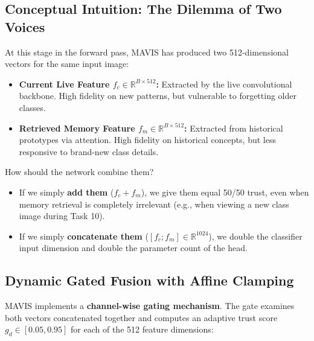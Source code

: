 \documentclass[11pt,a4paper]{article}
\begin{document}
\subsection{Conceptual Intuition: The Dilemma of Two Voices}
At this stage in the forward pass, MAVIS has produced two 512-dimensional vectors for the same input image:
\begin{itemize}[noitemsep]
    \item \textbf{Current Live Feature $f_c \in \mathbb{R}^{B \times 512}$:} Extracted by the live convolutional backbone. High fidelity on new patterns, but vulnerable to forgetting older classes.
    \item \textbf{Retrieved Memory Feature $f_m \in \mathbb{R}^{B \times 512}$:} Extracted from historical prototypes via attention. High fidelity on historical concepts, but less responsive to brand-new class details.
\end{itemize}
How should the network combine them? 
\begin{itemize}[noitemsep]
    \item If we simply \textbf{add them} ($f_c + f_m$), we give them equal 50/50 trust, even when memory retrieval is completely irrelevant (e.g., when viewing a new class image during Task 10).
    \item If we simply \textbf{concatenate them} ($[f_c ; f_m] \in \mathbb{R}^{1024}$), we double the classifier input dimension and double the parameter count of the head.
\end{itemize}

\subsection{Dynamic Gated Fusion with Affine Clamping}
MAVIS implements a \textbf{channel-wise gating mechanism}. The gate examines both vectors concatenated together and computes an adaptive trust score $g_d \in [0.05, 0.95]$ for each of the 512 feature dimensions:
\end{document}
